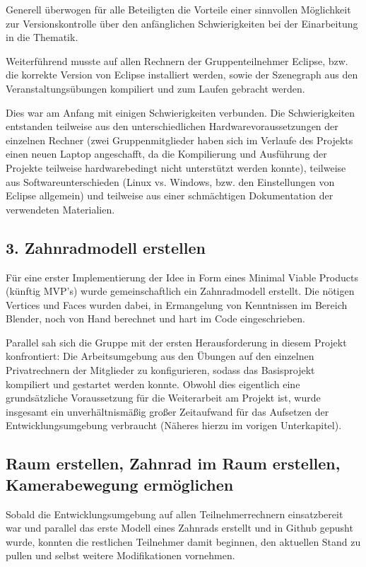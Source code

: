\documentclass{article}
\begin{document}
Generell überwogen für alle Beteiligten die Vorteile einer sinnvollen Möglichkeit zur Versionskontrolle über den anfänglichen Schwierigkeiten bei der Einarbeitung in die Thematik.

Weiterführend musste auf allen Rechnern der Gruppenteilnehmer Eclipse, bzw. die korrekte Version von Eclipse installiert werden, sowie der Szenegraph aus den Veranstaltungsübungen kompiliert und zum Laufen gebracht werden. 

Dies war am Anfang mit einigen Schwierigkeiten verbunden. 
Die Schwierigkeiten entstanden teilweise aus den unterschiedlichen Hardwarevoraussetzungen der einzelnen Rechner 
(zwei Gruppenmitglieder haben sich im Verlaufe des Projekts einen neuen Laptop angeschafft, da die Kompilierung und Ausführung der Projekte teilweise hardwarebedingt nicht unterstützt werden konnte), 
teilweise aus Softwareunterschieden (Linux vs. Windows, bzw. den Einstellungen von Eclipse allgemein) und teilweise aus einer schmächtigen Dokumentation der verwendeten Materialien. 



\subsection{3. Zahnradmodell erstellen}
Für eine erster Implementierung der Idee in Form eines Minimal Viable Products (künftig MVP's) wurde gemeinschaftlich ein Zahnradmodell erstellt. 
Die nötigen Vertices und Faces wurden dabei, in Ermangelung von Kenntnissen im Bereich Blender, noch von Hand berechnet und hart im Code eingeschrieben. 

Parallel sah sich die Gruppe mit der ersten Herausforderung in diesem Projekt konfrontiert: 
Die Arbeitsumgebung aus den Übungen auf den einzelnen Privatrechnern der Mitglieder zu konfigurieren, sodass das Basisprojekt kompiliert und gestartet werden konnte. 
Obwohl dies eigentlich eine grundsätzliche Voraussetzung für die Weiterarbeit am Projekt ist, wurde insgesamt ein unverhältnismäßig großer Zeitaufwand für das Aufsetzen der Entwicklungsumgebung verbraucht (Näheres hierzu im vorigen Unterkapitel). 



\subsection{Raum erstellen, Zahnrad im Raum erstellen, Kamerabewegung ermöglichen}
Sobald die Entwicklungsumgebung auf allen Teilnehmerrechnern einsatzbereit war und parallel das erste Modell eines Zahnrads erstellt und in Github gepusht wurde, konnten die restlichen Teilnehmer damit beginnen, den aktuellen Stand zu pullen und selbst weitere Modifikationen vornehmen. 
\end{document}
